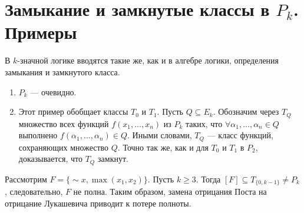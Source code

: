 \section{Замыкание и замкнутые классы в $P_k$. Примеры}

В $k$-значной логике вводятся такие же, как и в алгебре логики, определения замыкания и замкнутого класса.

\begin{example}
    \begin{enumerate}
        \item $P_k$ --- очевидно.
        \item Этот пример обобщает классы $T_0$ и $T_1$. Пусть $Q \subseteq E_k$. Обозначим через $T_Q$ множество всех функций $f(x_1, \ldots, x_n)$ из $P_k$ таких, что $\forall \alpha_1, \ldots, \alpha_n \in Q$ выполнено $f(\alpha_1, \ldots, \alpha_n) \in Q$. Иными словами, $T_Q$ --- класс функций, сохраняющих множество $Q$. Точно так же, как и для $T_0$ и $T_1$ в $P_2$, доказывается, что $T_Q$ замкнут.
    \end{enumerate}
\end{example}

Рассмотрим $F = \{{\sim}x, \max(x_1, x_2)\}$. Пусть $k \geqslant 3$. Тогда $[F] \subseteq T_{\{0, k - 1\}} \ne P_k$, следовательно, $F$ не полна. Таким образом, замена отрицания Поста на отрицание Лукашевича приводит к потере полноты.

